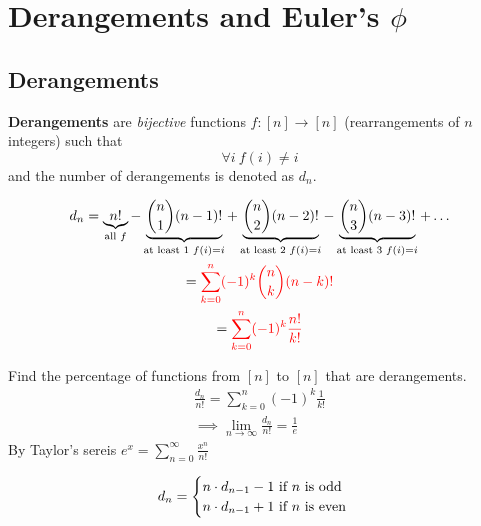 \documentclass{article}
\begin{document}
		\section{Derangements and Euler's $\phi$}
			\subsection{Derangements}
				\begin{definition}
					\textbf{Derangements} are \emph{bijective} functions $f:[n] \to [n]$ (rearrangements of $n$ integers) such that 
					\begin{equation}
						\forall i\ f(i) \neq i
					\end{equation}
					and the number of derangements is denoted as $d_n$.
				\end{definition}
				
				\begin{theorem}
					\begin{gather}
						d_n = 
						\underbrace{n!}_{\text{{all }}f}
						- \underbrace{\binom{n}{1} (n-1)!}_{\text{{at least 1 }}f(i) = i}
						+ \underbrace{\binom{n}{2} (n-2)!}_{\text{{at least 2 }}f(i) = i}
						- \underbrace{\binom{n}{3} (n-3)!}_{\text{{at least 3 }}f(i) = i} + \dots \\
						= \textcolor{red}{\sum_{k=0}^n (-1)^k \binom{n}{k}(n-k)!} \\
						= \textcolor{red}{\sum_{k=0}^n (-1)^k \frac{n!}{k!}}
					\end{gather}
				\end{theorem}
				
				\begin{theorem}
					Find the percentage of functions from $[n]$ to $[n]$ that are derangements.
					\begin{gather}
						\frac{d_n}{n!} = \sum_{k=0}^n (-1)^k \frac{1}{k!} \\
						\implies \lim_{n\to \infty} \frac{d_n}{n!} = \frac{1}{e}
					\end{gather}
					By Taylor's sereis $e^x = \sum_{n=0}^\infty \frac{x^n}{n!}$
				\end{theorem}
				
				\begin{proposition}
					\begin{equation}
						d_n = \begin{cases}
							n \cdot d_{n-1} - 1 \text{{ if $n$ is odd}} \\
							n \cdot d_{n-1} + 1 \text{{ if $n$ is even}}
						\end{cases}
					\end{equation}
				\end{proposition}
				
\end{document}

